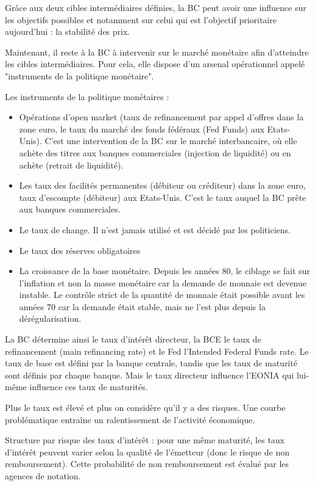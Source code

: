 Grâce aux deux cibles intermédiaires définies, la BC peut avoir une influence sur les objectifs possibles et notamment sur celui qui est l'objectif prioritaire aujourd'hui : la stabilité des prix.

Maintenant, il reste à la BC à intervenir sur le marché monétaire afin d'atteindre les cibles intermédiaires. Pour cela, elle dispose d'un arsenal opérationnel appelé "instruments de la politique monétaire".



Les instruments de la politique monétaires :

\begin{itemize}
	\item Opérations d'open market (taux de refinancement par appel d'offres dans la zone euro, le taux du marché des fonds fédéraux (Fed Funds) aux Etats-Unis). C'est une intervention de la BC sur le marché interbancaire, où elle achète des titres aux banques commerciales (injection de liquidité) ou en achète (retrait de liquidité).
	\item Les taux des facilités permanentes (débiteur ou créditeur) dans la zone euro, taux d'escompte (débiteur) aux Etats-Unis. C'est le taux auquel la BC prête aux banques commerciales.
	\item Le taux de change. Il n'est jamais utilisé et est décidé par les politiciens.
	\item Le taux des réserves obligatoires
	\item La croissance de la base monétaire. Depuis les années 80, le ciblage se fait sur l'inflation et non la masse monétaire car la demande de monnaie est devenue instable. Le contrôle strict de la quantité de monnaie était possible avant les années 70 car la demande était stable, mais ne l'est plus depuis la dérégularisation.
\end{itemize}


La BC détermine ainsi le taux d'intérêt directeur, la BCE le taux de refinancement (main refinancing rate) et le Fed l'Intended Federal Funds rate. Le taux de base est défini par la banque centrale, tandis que les taux de maturité sont définis par chaque banque. Mais le taux directeur influence l'EONIA qui lui-même influence ces taux de maturités.


Plus le taux est élevé et plus on considère qu'il y a des risques. Une courbe problématique entraîne un ralentissement de l'activité économique.

Structure par risque des taux d'intérêt : pour une même maturité, les taux d'intérêt peuvent varier selon la qualité de l'émetteur (donc le risque de non remboursement). Cette probabilité de non remboursement est évalué par les agences de notation.
	
